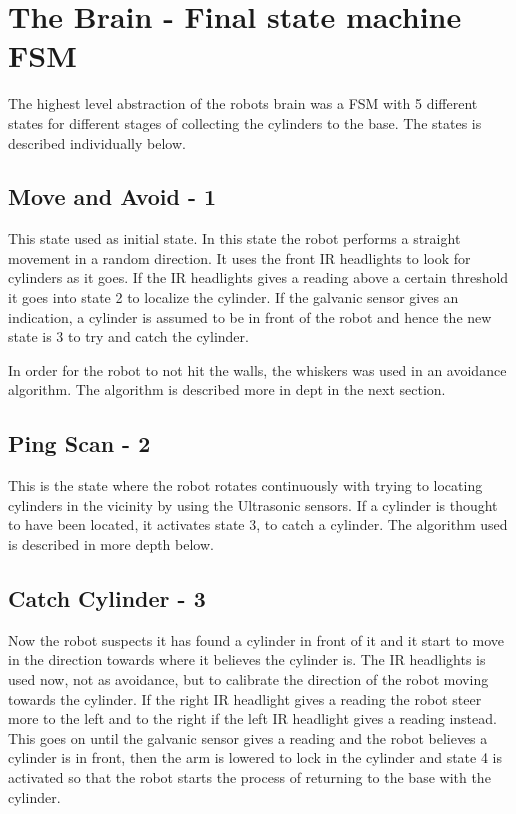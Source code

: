 
\section{The Brain - Final state machine FSM}
The highest level abstraction of the robots brain was a FSM with 5 different states for different stages of collecting the cylinders to the base. The states is described individually below.

\subsection{Move and Avoid - 1}
This state used as initial state. In this state the robot performs a straight movement in a random direction. It uses the front IR headlights to look for cylinders as it goes. If the IR headlights gives a reading above a certain threshold it goes into state 2 to localize the cylinder.
If the galvanic sensor gives an indication, a cylinder is assumed to be in front of the robot and hence the new state is 3 to try and catch the cylinder.

In order for the robot to not hit the walls, the whiskers was used in an avoidance algorithm. The algorithm is described more in dept in the next section.

\subsection{Ping Scan - 2}
This is the state where the robot rotates continuously with trying to locating cylinders in the vicinity by using the Ultrasonic sensors. If a cylinder is thought to have been located, it activates state 3, to catch a cylinder. The algorithm used is described in more depth below.



\subsection{Catch Cylinder - 3}
Now the robot suspects it has found a cylinder in front of it and it start to move in the direction towards where it believes the cylinder is. The IR headlights is used now, not as avoidance, but to calibrate the direction of the robot moving towards the cylinder. If the right IR headlight gives a reading the robot steer more to the left and to the right if the left IR headlight gives a reading instead. This goes on until the galvanic sensor gives a reading and the robot believes a cylinder is in front, then the arm is lowered to lock in the cylinder and state 4 is activated so that the robot starts the process of returning to the base with the cylinder.

